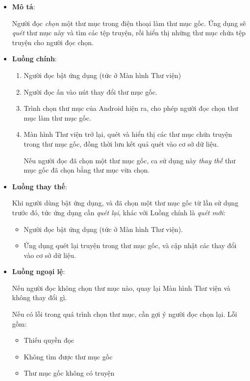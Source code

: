 \documentclass[
]{article}
\providecommand{\tightlist}{%
  \setlength{\itemsep}{0pt}\setlength{\parskip}{0pt}}
\begin{document}
\begin{itemize}
\item
  \textbf{Mô tả}:

  Người đọc \emph{chọn} một thư mục trong điện thoại làm thư mục gốc.
  Ứng dụng sẽ \emph{quét} thư mục này và tìm các tệp truyện, rồi hiển
  thị những thư mục chứa tệp truyện cho người đọc chọn.
\item
  \textbf{Luồng chính}:

  \begin{enumerate}
  \def\labelenumi{\arabic{enumi}.}
  \item
    Người đọc bật ứng dụng (tức ở Màn hình Thư viện)
  \item
    Người đọc ấn vào nút thay đổi thư mục gốc.
  \item
    Trình chọn thư mục của Android hiện ra, cho phép người đọc chọn thư
    mục làm thư mục gốc.
  \item
    Màn hình Thư viện trở lại, quét và hiển thị các thư mục chứa truyện
    trong thư mục gốc, đồng thời lưu kết quả quét vào cơ sở dữ liệu.

    Nếu người đọc đã chọn một thư mục gốc, ca sử dụng này \emph{thay
    thế} thư mục gốc đã chọn bằng thư mục vừa chọn.
  \end{enumerate}
\item
  \textbf{Luồng thay thế}:

  Khi người dùng bật ứng dụng, và đã chọn một thư mục gốc từ lần sử dụng
  trước đó, tức ứng dụng cần \emph{quét lại}, khác với Luồng chính là
  \emph{quét mới}:

  \begin{itemize}
  \tightlist
  \item
    Người đọc bật ứng dụng (tức ở Màn hình Thư viện).
  \item
    Ứng dụng quét lại truyện trong thư mục gốc, và cập nhật các thay đổi
    vào cơ sở dữ liệu.
  \end{itemize}
\item
  \textbf{Luồng ngoại lệ}:

  Nếu người đọc không chọn thư mục nào, quay lại Màn hình Thư viện và
  không thay đổi gì.

  Nếu có lỗi trong quá trình chọn thư mục, cần gợi ý người đọc chọn lại.
  Lỗi gồm:

  \begin{itemize}
  \tightlist
  \item
    Thiếu quyền đọc
  \item
    Không tìm được thư mục gốc
  \item
    Thư mục gốc không có truyện
  \end{itemize}


\end{itemize}
\end{document}
